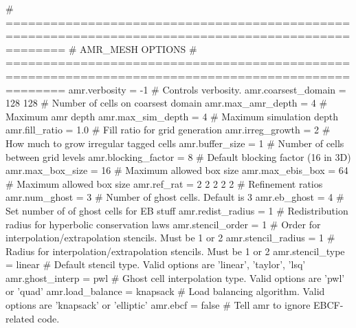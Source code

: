 \begin{DoxyVerb}
  # ====================================================================================================
  # AMR_MESH OPTIONS
  # ====================================================================================================
  amr.verbosity       = -1          # Controls verbosity. 
  amr.coarsest_domain = 128 128     # Number of cells on coarsest domain
  amr.max_amr_depth   = 4           # Maximum amr depth
  amr.max_sim_depth   = 4           # Maximum simulation depth
  amr.fill_ratio      = 1.0         # Fill ratio for grid generation
  amr.irreg_growth    = 2           # How much to grow irregular tagged cells
  amr.buffer_size     = 1           # Number of cells between grid levels
  amr.blocking_factor = 8           # Default blocking factor (16 in 3D)
  amr.max_box_size    = 16          # Maximum allowed box size
  amr.max_ebis_box    = 64          # Maximum allowed box size
  amr.ref_rat         = 2 2 2 2 2   # Refinement ratios
  amr.num_ghost       = 3           # Number of ghost cells. Default is 3
  amr.eb_ghost        = 4           # Set number of of ghost cells for EB stuff
  amr.redist_radius   = 1           # Redistribution radius for hyperbolic conservation laws
  amr.stencil_order   = 1           # Order for interpolation/extrapolation stencils. Must be 1 or 2
  amr.stencil_radius  = 1           # Radius for interpolation/extrapolation stencils. Must be 1 or 2
  amr.stencil_type    = linear      # Default stencil type. Valid options are 'linear', 'taylor', 'lsq'
  amr.ghost_interp    = pwl         # Ghost cell interpolation type. Valid options are 'pwl' or 'quad'
  amr.load_balance    = knapsack    # Load balancing algorithm. Valid options are 'knapsack' or 'elliptic'
  amr.ebcf            = false       # Tell amr to ignore EBCF-related code. 


\end{DoxyVerb}
